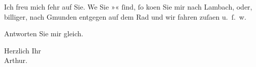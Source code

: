 \pstart
           Ich freu mich{ }ſehr auf Sie. We{\geminationn}{ }{\pb}Sie »\textsc{}«{ }ſind,{ }ſo ko{\geminationm}en Sie mir nach Lambach, oder, billiger, nach Gmunden entgegen auf dem Rad und wir fahren zuſa{\geminationm}en u. ſ. w.\pend
           
\pstart
           Antworten Sie mir gleich.\pend
           
\pstart
           Herzlich Ihr{\\}\spacefill\mbox{Arthur.}\pend
           \endnumbering{}  \newcommand{\dateiname}{L00685}\newcommand{\titel}{Arthur Schnitzler an Richard Beer-Hofmann, 12. 6. 1897}\newcommand{\editorInnen}{Martin Anton Müller und Gerd-Hermann Susen}
